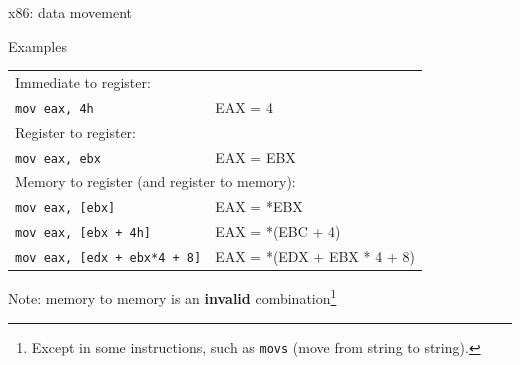 \documentclass[]{beamer}
\begin{document}

\begin{frame}{x86: data movement}
\begin{block}{Examples}
\begin{tabular}{ll}
\multicolumn{2}{l}{Immediate to register:}\\
{\tt mov eax, 4h} & {\small EAX = 4} \\[.4em]
\multicolumn{2}{l}{Register to register:}\\
{\tt mov eax, ebx} & {\small EAX = EBX} \\[.4em]
\multicolumn{2}{l}{Memory to register (and register to memory):}\\
{\tt mov eax, [ebx]} & {\small EAX = *EBX} \\
{\tt mov eax, [ebx + 4h]} & {\small EAX = *(EBC + 4)} \\
{\tt mov eax, [edx + ebx*4 + 8]} & {\small EAX = *(EDX + EBX * 4 + 8)}
\end{tabular}
\end{block}
Note: memory to memory is an \textbf{invalid} combination\footnote{Except in some instructions, such as {\tt movs} (move from string to string).}
\end{frame}
\end{document}

